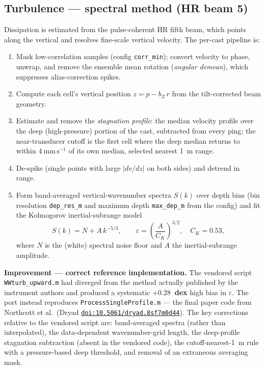 \documentclass[11pt]{article}
\newcommand{\code}[1]{\texttt{#1}}
\newcommand{\eps}{\varepsilon}
\begin{document}
\subsection{Turbulence --- spectral method (HR beam 5)}

Dissipation is estimated from the pulse-coherent HR fifth beam, which points along the
vertical and resolves fine-scale vertical velocity. The per-cast pipeline is:

\begin{enumerate}
\item Mask low-correlation samples (config \code{corr\_min}); convert velocity to phase,
unwrap, and remove the ensemble mean rotation (\emph{angular demean}), which suppresses
alias-correction spikes.
\item Compute each cell's vertical position $z = p - b_Z\,r$ from the tilt-corrected beam
geometry.
\item Estimate and remove the \emph{stagnation profile}: the median velocity profile over the
deep (high-pressure) portion of the cast, subtracted from every ping; the near-transducer
cutoff is the first cell where the deep median returns to within $4~\mathrm{mm\,s^{-1}}$ of its
own median, selected nearest 1~m range.
\item De-spike (single points with large $|dv/dz|$ on both sides) and detrend in range.
\item Form band-averaged vertical-wavenumber spectra $S(k)$ over depth bins (bin resolution
\code{dep\_res\_m} and maximum depth \code{max\_dep\_m} from the config) and fit the Kolmogorov
inertial-subrange model
\begin{equation}
S(k) = N + A\,k^{-5/3}, \qquad
\eps = \left(\frac{A}{C_K}\right)^{3/2},\quad C_K = 0.53,
\end{equation}
where $N$ is the (white) spectral noise floor and $A$ the inertial-subrange amplitude.
\end{enumerate}

\textbf{Improvement --- correct reference implementation.} The vendored script
\code{WWturb\_upward.m} had diverged from the method actually published by the instrument
authors and produced a systematic \textbf{$+0.28$~dex} high bias in $\eps$. The port instead
reproduces \code{ProcessSingleProfile.m} --- the final paper code from Northcott et al.\ (Dryad
\href{https://doi.org/10.5061/dryad.8sf7m0d44}{\code{doi:10.5061/dryad.8sf7m0d44}}). The key
corrections relative to the vendored script are: band-averaged spectra (rather than
interpolated), the data-dependent wavenumber-grid length, the deep-profile stagnation
subtraction (absent in the vendored code), the cutoff-nearest-1~m rule with a pressure-based
deep threshold, and removal of an extraneous averaging mask.
\end{document}

